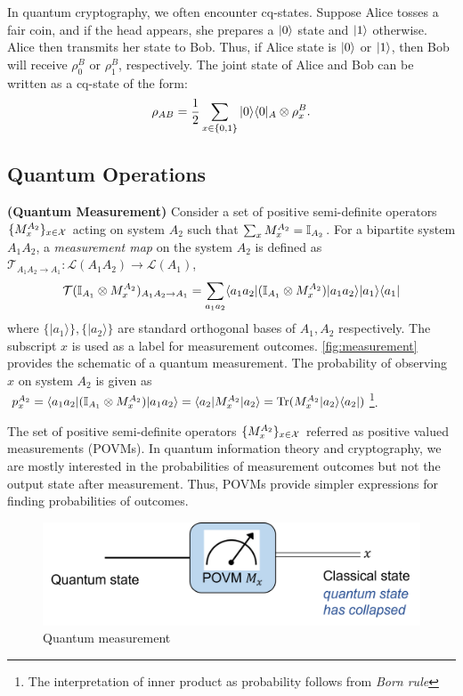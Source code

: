 \begin{example} In quantum cryptography, we often encounter cq-states. Suppose Alice tosses a fair coin, and if the head appears, she prepares a $|0 \rangle$ state and $|1 \rangle$ otherwise. Alice then transmits her state to Bob. Thus, if Alice state is $|0 \rangle$ or $|1 \rangle$, then Bob will receive $\rho_0^B$ or $\rho_1^B$, respectively. The joint state of Alice and Bob can be written as a cq-state of the form:
\[\rho_{AB} =  \frac{1}{2}  \sum_{x\in \{0,1\}} |0 \rangle\langle 0|_A \otimes \rho_x^B.\]
\end{example}


\subsection{Quantum Operations} 
\begin{definition}\textbf{(Quantum Measurement)}
Consider a set of positive semi-definite operators $\{M_x^{A_2}\}_{x\in \mathcal{X}}$ acting on system $A_2$ such that $\sum_x M_x^{A_2} = \mathbb{I}_{A_2}$. For a bipartite system $A_1A_2$, a \emph{measurement map} on the system $A_2$ is defined as $\mathcal{T}_{A_1A_2 \rightarrow A_1}:\mathcal{L}(A_1A_2) \rightarrow \mathcal{L}(A_1)$,
$$\mathcal{T}(\mathbb{I}_{A_1} \otimes M_x^{A_2})_{A_1A_2 \rightarrow A_1} = \sum_{a_1a_2} \langle a_1a_2|(\mathbb{I}_{A_1} \otimes M_x^{A_2})|a_1a_2 \rangle |a_1\rangle \langle a_1|$$
where $\{|a_1\rangle\}, \{|a_2\rangle\}$ are standard orthogonal bases of $A_1, A_2$ respectively. The subscript $x$ is used as a label for measurement outcomes. \autoref{fig:measurement} provides the schematic of a quantum measurement. The probability of observing $x$ on system $A_2$ is given as $p_x^{A_2} = \langle a_1a_2|(\mathbb{I}_{A_1} \otimes M_x^{A_2})|a_1a_2 \rangle = \langle a_2|M_x^{A_2}|a_2 \rangle = \operatorname{Tr}(M_x^{A_2}|a_2 \rangle \langle a_2|)$\footnote{The interpretation of inner product as probability follows from \textit{Born rule}}.

The set of positive semi-definite operators $\{M_x^{A_2}\}_{x\in \mathcal{X}}$ referred as positive valued measurements (POVMs). In quantum information theory and cryptography, we are mostly interested in the probabilities of measurement outcomes but not the output state after measurement. Thus, POVMs provide simpler expressions for finding probabilities of outcomes. 
\end{definition}
\begin{figure}[!htb]
    \centering
    \includegraphics[scale=0.45]{Images/measurement.png}
    \caption{Quantum measurement}
    \label{fig:measurement}
\end{figure}
